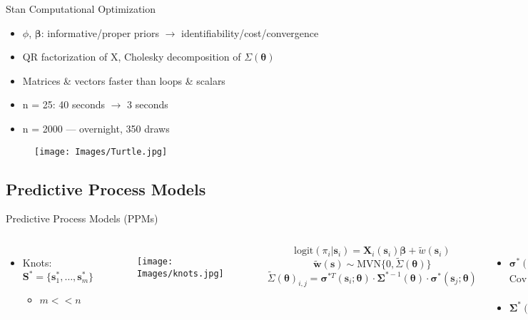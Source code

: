 \documentclass{beamer}
\begin{document}
\begin{frame}[fragile]{Stan Computational Optimization}{}
  \begin{itemize}
  \addtolength{\itemsep}{0.5\baselineskip}
  \item  $\phi$, $\pmb{\beta}$: informative/proper priors $\rightarrow$ identifiability/cost/convergence
  \item QR factorization of X, Cholesky decomposition of $\Sigma(\pmb{\theta})$
  \item Matrices \& vectors faster than loops \& scalars
  \item n = 25: 40 seconds $\rightarrow$ 3 seconds
  \item n = 2000 --- overnight, 350 draws
  \end{itemize}
        \begin{figure}[H]
      	\centering
      	\texttt{[image: Images/Turtle.jpg]}
      	\end{figure}
\end{frame}

\subsection{Predictive Process Models}

\begin{frame}{Predictive Process Models (PPMs)}{\citep{Banerjee2008}}
\begin{columns}


\begin{itemize}
\item Knots: $\pmb{S}^{*} = \{\pmb{s}_{1}^{*}, \dots, \pmb{s}_{m}^{*}\}$
      \begin{itemize}
      \item $m < < n$
      \end{itemize}
\end{itemize}

  \begin{figure}[H]
	\centering
	\texttt{[image: Images/knots.jpg]}
	\end{figure}


$$\text{logit}(\pi_{i}|\pmb{s}_{i}) = \pmb{X}_{i}(\pmb{s}_{i}) \pmb{\beta} + \widetilde{w}(\pmb{s}_{i}) $$
$$\widetilde{\pmb{w}}(\pmb{s}) \sim \text{MVN}\{0, \widetilde{\Sigma}(\pmb{\theta})\} $$
$$\widetilde{\Sigma}(\pmb{\theta})_{i,j} = \pmb{\sigma}^{*T}(\pmb{s}_{i};\pmb{\theta}) \cdot \pmb{\Sigma}^{*-1}(\pmb{\theta}) \cdot \pmb{\sigma}^{*}(\pmb{s}_{j};\pmb{\theta})$$
    \begin{itemize}
    \addtolength{\itemsep}{0.5\baselineskip}
    \item $\pmb{\sigma}^{*}(\pmb{s}_{i};\pmb{\theta})$ = $\text{Cov}(\pmb{s}_{i}, \pmb{S}^{*})$
    \item $\pmb{\Sigma}^{*}(\pmb{\theta}) = \text{Var}(\pmb{S}^{*})$
    \end{itemize}

\end{columns}
\end{frame}
\end{document}
